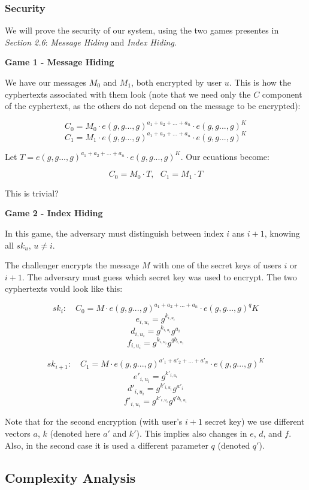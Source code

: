 \documentclass[a4paper, 12pt, oneside]{article}
\begin{document}
\begin{enumerate}
\subsubsection{Security}

We will prove the security of our system, using the two games presentes in \textit{Section 2.6}: \textit{Message Hiding} and \textit{Index Hiding}.

\textbf{Game 1 - Message Hiding}

We have our messages $M_0$ and $M_1$, both encrypted by user $u$. This is how the cyphertexts associated with them look (note that we need only the $C$ component of the cyphertext, as the others do not depend on the message to be encrypted):

\[C_0 = M_0 \cdot e(g, g..., g)^{a_1+a_2+...+a_n} \cdot e(g, g..., g)^K \]
\[C_1 = M_1 \cdot e(g, g..., g)^{a_1+a_2+...+a_n} \cdot e(g, g..., g)^K \]

Let $T = e(g, g..., g)^{a_1+a_2+...+a_n} \cdot e(g, g..., g)^K $.
Our ecuations become:

\[C_0 = M_0 \cdot T,\ \ \ C_1 = M_1 \cdot T\]

This is trivial?

\textbf{Game 2 - Index Hiding}

In this game, the adversary must distinguish between index $i$ ans $i + 1$, knowing  all $sk_u$, $u \neq i$.

The challenger encrypts the message $M$ with one of the secret keys of users $i$ or $i + 1$. The adversary must guess which secret key was used to encrypt. The two cyphertexts vould look like this:


\[sk_i: \quad 
C_0 = M \cdot e(g, g..., g)^{a_1+a_2+...+a_n} \cdot e(g, g..., g)^qK 
\]
\[ e_{i, u_i} = g^{k_{i, u_i}} \]
\[ d_{i, u_i} = g^{k_{i, u_i}} g^{a_i} \]
\[ f_{i, u_i} = g^{k_{i, u_i}} g^{qb_{i, u_i}} \]

\[sk_{i+1}: \quad 
C_1 = M \cdot e(g, g..., g)^{a'_1+a'_2+...+a'_n} \cdot e(g, g..., g)^K\]
\[ e'_{i, u_i} = g^{k'_{i, u_i}} \]
\[ d'_{i, u_i} = g^{k'_{i, u_i}} g^{a'_i} \]
\[ f'_{i, u_i} = g^{k'_{i, u_i}} g^{q'b_{i, u_i}} \]

Note that for the second encryption (with user's $i+1$ secret key) we use different vectors $a$, $k$ (denoted here $a'$ and $k'$). This implies also changes in $e$, $d$, and $f$. Also, in the second case it is used a different parameter $q$ (denoted $q'$).


\end{enumerate}
\subsection{Complexity Analysis}
\end{document}
